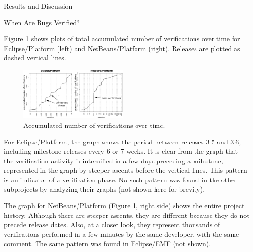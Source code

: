 \begin{section}{Results and Discussion}
\begin{subsection}{When Are Bugs Verified?}
	

	Figure \ref{fig:when} shows plots of total accumulated number of verifications over time for Eclipse/Platform (left) and NetBeans/Platform (right). Releases are plotted as dashed vertical lines.	

\begin{figure}
\centering
\includegraphics[width=0.48\textwidth]{when}
\caption{Accumulated number of verifications over time.} \label{fig:when}
\end{figure}


	For Eclipse/Platform, the graph shows the period between releases 3.5 and 3.6, including milestone releases every 6 or 7 weeks. It is clear from the graph that the verification activity is intensified in a few days preceding a milestone, represented in the graph by steeper ascents before the vertical lines. This pattern is an indicator of a verification phase. No such pattern was found in the other subprojects by analyzing their graphs (not shown here for brevity).

	The graph for NetBeans/Platform (Figure \ref{fig:when}, right side) shows the entire project history. Although there are steeper ascents, they are different because they do not precede release dates. Also, at a closer look, they represent thousands of verifications performed in a few minutes by the same developer, with the same comment. The same pattern was found in Eclipse/EMF (not shown).
	

\end{subsection}
\end{section}
